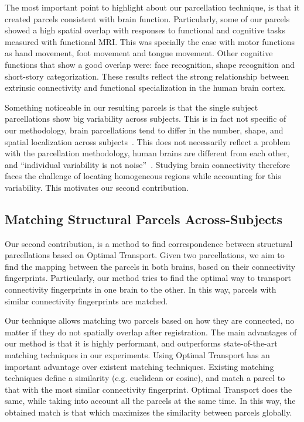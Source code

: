 The most important point to highlight about our parcellation technique, is that
it created parcels consistent with brain function. Particularly, some of our
parcels showed a high spatial overlap with responses to functional and cognitive
tasks measured with functional MRI. This was specially the case with motor functions as
hand movement, foot movement and tongue movement. Other cognitive functions that
show a good overlap were: face recognition, shape recognition and short-story
categorization. These results reflect the strong relationship between extrinsic
connectivity and functional specialization in the human brain cortex. 

Something noticeable in our resulting parcels is that the single subject parcellations
show big variability across subjects. This is in fact not specific of our methodology,
brain parcellations tend to differ in the number, shape, and spatial localization
across subjects~\cite{Jbabdi2013}. This does not necessarily reflect a problem
with the parcellation methodology, human brains are different from each other,
and ``individual variability is not noise''~\cite{Zilles2013}. Studying brain
connectivity therefore faces the challenge of locating homogeneous regions while
accounting for this variability. This motivates our second contribution.

\subsection{Matching Structural Parcels Across-Subjects}
Our second contribution, is a method to find correspondence between structural
parcellations based on Optimal Transport. Given two parcellations, we aim to
find the mapping between the parcels in both brains, based on their connectivity
fingerprints. Particularly, our method tries to find the optimal way to transport
connectivity fingerprints in one brain to the other. In this way, parcels with
similar connectivity fingerprints are matched.

Our technique allows matching two parcels based on how they are connected,
no matter if they do not spatially overlap after registration. The main advantages
of our method is that it is highly performant, and outperforms state-of-the-art
matching techniques in our experiments. Using Optimal Transport has an important
advantage over existent matching techniques. Existing matching techniques define
a similarity (e.g. euclidean or cosine), and match a parcel to that with the
most similar connectivity fingerprint. Optimal Transport does the same, while
taking into account all the parcels at the same time. In this way, the
obtained match is that which maximizes the similarity between parcels globally.

